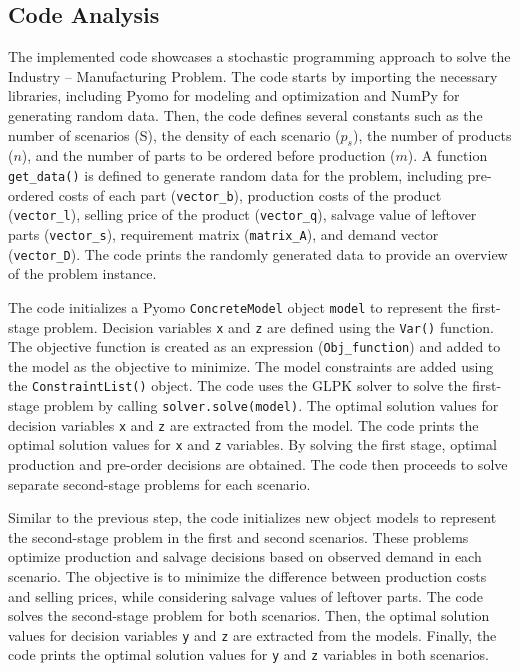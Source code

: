 \documentclass[a4paper]{article}
\begin{document}
		\subsection{Code Analysis}
		The implemented code showcases a stochastic programming approach to solve the Industry – Manufacturing Problem. The code starts by importing the necessary libraries, including Pyomo for modeling and optimization and NumPy for generating random data. Then, the code defines several constants such as the number of scenarios (S), the density of each scenario (\(p_s\)), the number of products (\(n\)), and the number of parts to be ordered before production (\(m\)). A function \texttt{get\_data()} is defined to generate random data for the problem, including pre-ordered costs of each part (\texttt{vector\_b}), production costs of the product (\texttt{vector\_l}), selling price of the product (\texttt{vector\_q}), salvage value of leftover parts (\texttt{vector\_s}), requirement matrix (\texttt{matrix\_A}), and demand vector (\texttt{vector\_D}). The code prints the randomly generated data to provide an overview of the problem instance.
		
		The code initializes a Pyomo \texttt{ConcreteModel} object \texttt{model} to represent the first-stage problem. Decision variables \texttt{x} and \texttt{z} are defined using the \texttt{Var()} function. The objective function is created as an expression (\texttt{Obj\_function}) and added to the model as the objective to minimize. The model constraints are added using the \texttt{ConstraintList()} object. The code uses the GLPK solver to solve the first-stage problem by calling \texttt{solver.solve(model)}. The optimal solution values for decision variables \texttt{x} and \texttt{z} are extracted from the model. The code prints the optimal solution values for \texttt{x} and \texttt{z} variables. By solving the first stage, optimal production and pre-order decisions are obtained. The code then proceeds to solve separate second-stage problems for each scenario.
		
		Similar to the previous step, the code initializes new object models to represent the second-stage problem in the first and second scenarios. These problems optimize production and salvage decisions based on observed demand in each scenario. The objective is to minimize the difference between production costs and selling prices, while considering salvage values of leftover parts. The code solves the second-stage problem for both scenarios. Then, the optimal solution values for decision variables \texttt{y} and \texttt{z} are extracted from the models. Finally, the code prints the optimal solution values for \texttt{y} and \texttt{z} variables in both scenarios.
\end{document}
